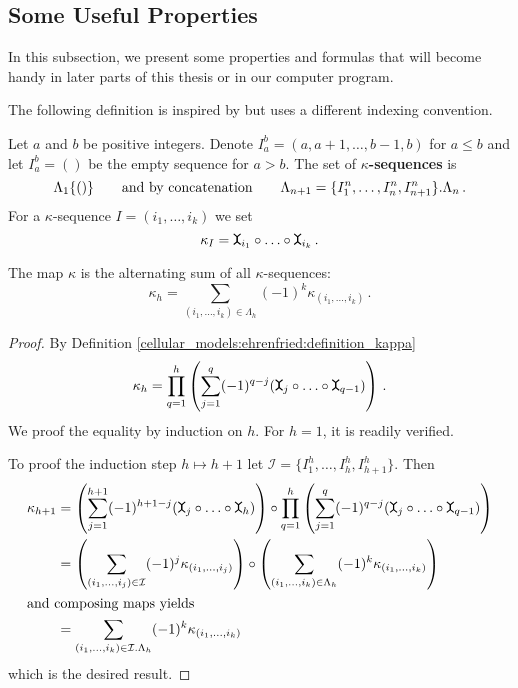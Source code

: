 \subsection{Some Useful Properties}
In this subsection, we present some properties and formulas that will become handy in later parts of this thesis or in our computer program.

The following definition is inspired by \cite[Lemma 2.3.33]{Hess2012} but uses a different indexing convention.
\begin{defi}
    \label{cellular_models:ehrenfried:kappa_sequences}
    Let $a$ and $b$ be positive integers.
    Denote $I_a^b = (a,a+1, \ldots, b-1, b)$ for $a \le b$ and let $I_a^b = ()$ be the empty sequence for $a > b$.
    The set of {\bf $\kappa$-sequences} is
    \[
        \Lambda_1 \{ () \} \mspc{and by concatenation}{20} \Lambda_{n+1} = \{ I_1^n, \ldots, I_n^n, I_{n+1}^n \}.\Lambda_n \,.
    \]
    For a $\kappa$-sequence $I = (i_1, \ldots, i_k)$ we set
    \[
        \kappa_I = \mueta_{i_1} \circ \ldots \circ \mueta_{i_k} \,.
    \]
\end{defi}

\begin{lem}
    \label{cellular_models:ehrenfried:formula_for_kappa}
    The map $\kappa$ is the alternating sum of all $\kappa$-sequences:
    \[
        \kappa_h = \sum_{(i_1, \ldots, i_k) \in \Lambda_h} (-1)^k \kappa_{(i_1, \ldots, i_k)} \,.
    \]
\end{lem}

\begin{proof}
    By Definition \ref{cellular_models:ehrenfried:definition_kappa}
    \[
        \kappa_h = \prod_{q=1}^h \left( \sum_{j=1}^q (-1)^{q-j} (\mueta_j \circ \ldots \circ \mueta_{q-1}) \right) \,.
    \]
    We proof the equality by induction on $h$.
    For $h = 1$, it is readily verified.
    
    To proof the induction step $h \mapsto h+1$ let $\mathcal I = \{ I_1^h, \ldots, I_h^h, I_{h+1}^h \}$.
    Then
    \begin{align}
        \kappa_{h+1}
            &= \left( \sum_{j=1}^{h+1} (-1)^{h+1-j} (\mueta_j \circ \ldots \circ \mueta_h) \right) \circ \prod_{q=1}^{h} \left( \sum_{j=1}^q (-1)^{q-j} (\mueta_j \circ \ldots \circ \mueta_{q-1}) \right) \\
            &= \left( \sum_{(i_1, \ldots, i_j) \in \mathcal I} (-1)^{j} \kappa_{(i_1, \ldots, i_j)} \right) \circ \left( \sum_{(i_1, \ldots, i_k) \in \Lambda_h} (-1)^k \kappa_{(i_1, \ldots, i_k)} \right) \\
            \intertext{and composing maps yields}
            &= \sum_{(i_1, \ldots, i_k) \in \mathcal I .\Lambda_h} (-1)^k \kappa_{(i_1, \ldots, i_k)}
    \end{align}
    which is the desired result.
\end{proof}

